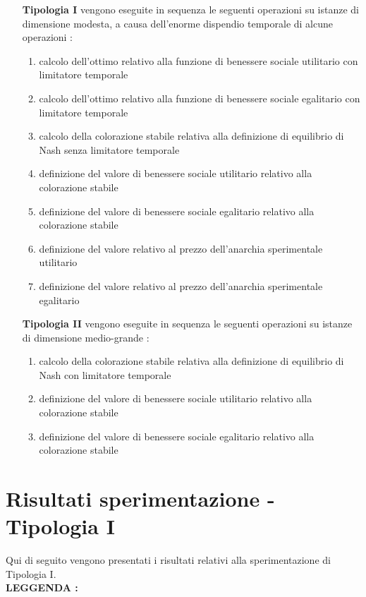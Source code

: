 \begin{itemize}
	\item [\textbf{Tipologia I}] vengono eseguite in sequenza le seguenti operazioni su istanze di dimensione modesta, a causa dell'enorme dispendio temporale di alcune operazioni :
	\begin{enumerate}
		\item calcolo dell'ottimo relativo alla funzione di benessere sociale utilitario con limitatore temporale
		\item calcolo dell'ottimo relativo alla funzione di benessere sociale egalitario con limitatore temporale
		\item calcolo della colorazione stabile relativa alla definizione di equilibrio di Nash senza limitatore temporale
		\item definizione del valore di benessere sociale utilitario relativo alla colorazione stabile
		\item definizione del valore di benessere sociale egalitario relativo alla colorazione stabile
		\item definizione del valore relativo al prezzo dell'anarchia sperimentale utilitario
		\item definizione del valore relativo al prezzo dell'anarchia sperimentale egalitario
	\end{enumerate}
	\item [\textbf{Tipologia II}] vengono eseguite in sequenza le seguenti operazioni su istanze di dimensione medio-grande :
	\begin{enumerate}
		\item calcolo della colorazione stabile relativa alla definizione di equilibrio di Nash con limitatore temporale
		\item definizione del valore di benessere sociale utilitario relativo alla colorazione stabile
		\item definizione del valore di benessere sociale egalitario relativo alla colorazione stabile
	\end{enumerate}
\end{itemize}

\section{Risultati sperimentazione - Tipologia I}
\justify
Qui di seguito vengono presentati i risultati relativi alla sperimentazione di Tipologia I.\\

\textbf{LEGGENDA : }

